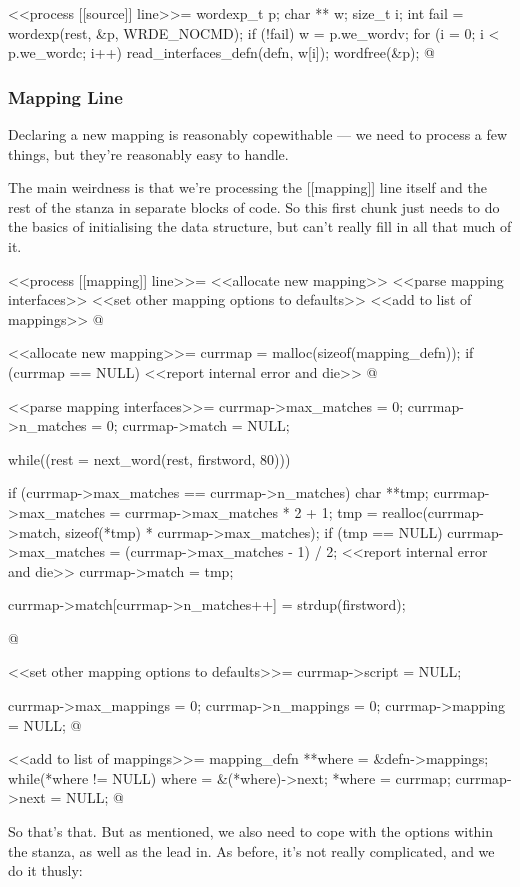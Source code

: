 \documentclass{article}
\begin{document}
<<process [[source]] line>>=
wordexp_t p;
char ** w;
size_t i;
int fail = wordexp(rest, &p, WRDE_NOCMD);
if (!fail)
{
	w = p.we_wordv;
	for (i = 0; i < p.we_wordc; i++)
	{
		read_interfaces_defn(defn, w[i]);
	}
	wordfree(&p);
}
@

\subsubsection{Mapping Line}

Declaring a new mapping is reasonably copewithable --- we need to process
a few things, but they're reasonably easy to handle.

The main weirdness is that we're processing the [[mapping]] line itself
and the rest of the stanza in separate blocks of code. So this first
chunk just needs to do the basics of initialising the data structure,
but can't really fill in all that much of it.

<<process [[mapping]] line>>=
<<allocate new mapping>>
<<parse mapping interfaces>>
<<set other mapping options to defaults>>
<<add to list of mappings>>
@ 

<<allocate new mapping>>=
currmap = malloc(sizeof(mapping_defn));
if (currmap == NULL) {
	<<report internal error and die>>
}
@ 

<<parse mapping interfaces>>=
currmap->max_matches = 0;
currmap->n_matches = 0;
currmap->match = NULL;

while((rest = next_word(rest, firstword, 80))) {
	if (currmap->max_matches == currmap->n_matches) {
		char **tmp;
		currmap->max_matches = currmap->max_matches * 2 + 1;
		tmp = realloc(currmap->match, 
			sizeof(*tmp) * currmap->max_matches);
		if (tmp == NULL) {
			currmap->max_matches = (currmap->max_matches - 1) / 2;
			<<report internal error and die>>
		}
		currmap->match = tmp;
	}

	currmap->match[currmap->n_matches++] = strdup(firstword);
}
@ 

<<set other mapping options to defaults>>=
currmap->script = NULL;

currmap->max_mappings = 0;
currmap->n_mappings = 0;
currmap->mapping = NULL;
@ 

<<add to list of mappings>>=
{
	mapping_defn **where = &defn->mappings;
	while(*where != NULL) {
		where = &(*where)->next;
	}
	*where = currmap;
	currmap->next = NULL;
}
@ 

So that's that. But as mentioned, we also need to cope with the options
within the stanza, as well as the lead in. As before, it's not really
complicated, and we do it thusly:
\end{document}
